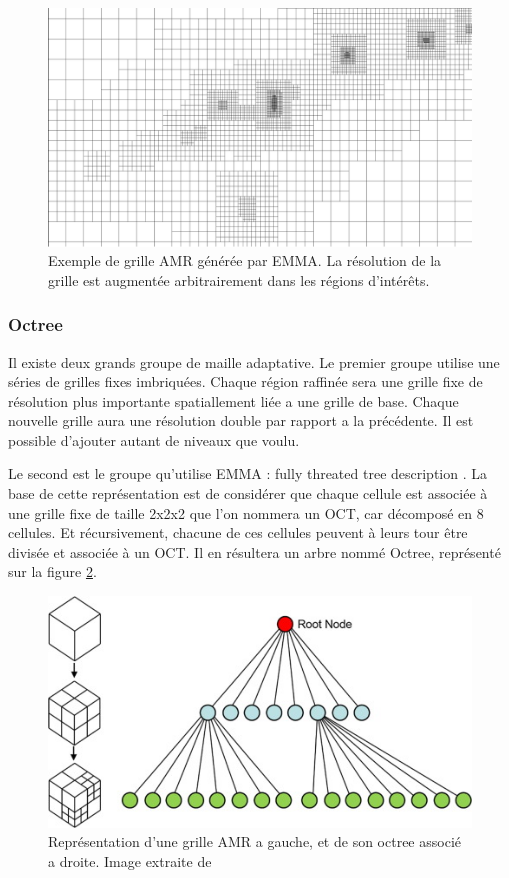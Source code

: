 \begin{figure}[bth]
        \includegraphics[width=.95\linewidth]{img/02/AMR.pdf} 
        \caption[Grille générée par EMMA]{Exemple de grille \ac{AMR} générée par EMMA. 
        La  résolution de la grille est augmentée arbitrairement dans les régions d'intérêts.
}
 		\label{fig:AMR}
\end{figure}

\subsubsection{Octree}

Il existe deux grands groupe de maille adaptative.
Le premier groupe utilise une séries de grilles fixes imbriquées. %
Chaque région raffinée sera une grille fixe de résolution plus importante spatiallement liée a une grille de base.
Chaque nouvelle grille aura une résolution double par rapport a la précédente.
Il est possible d'ajouter autant de niveaux que voulu.

Le second est le groupe qu'utilise EMMA : fully threated tree description \citep{khokhlov_fully_1998-1}.
La base de cette représentation est de considérer que chaque cellule est associée à une grille fixe de taille 2x2x2 que l'on nommera un OCT, car décomposé en 8 cellules.
Et récursivement, chacune de ces cellules peuvent à leurs tour être divisée et associée à un OCT.
Il en résultera un arbre nommé Octree, représenté sur la figure \ref{fig:octree}.

\begin{figure}[bth]
        \includegraphics[width=.95\linewidth]{img/02/octree.jpg} 
        \caption[Grille AMR et son octree]{Représentation d'une grille AMR a gauche, et de son octree associé a droite. 
        Image extraite de \cite{SU201659}
     	\label{fig:octree}
}
\end{figure}

